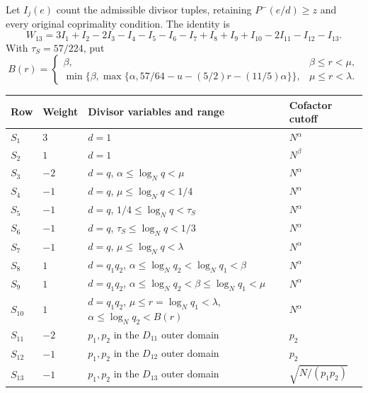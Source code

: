 Let $I_j(e)$ count the admissible divisor tuples,
retaining $P^-(e/d)\ge z$ and every original coprimality condition.
The identity is
\[
 W_{13}=3I_1+I_2-2I_3-I_4-I_5-I_6-I_7
                 +I_8+I_9+I_{10}-2I_{11}-I_{12}-I_{13}.
 \tag{4.7}
\]
With $\tau_S=57/224$, put
\[
 B(r)=
 \begin{cases}
 \beta,&\beta\le r<\mu,\\
 \min\{\beta,\max\{\alpha,57/64-u-(5/2)r-(11/5)\alpha\}\},
             &\mu\le r<\lambda.
 \end{cases}
 \tag{4.8}
\]
\begingroup
\setlength{\tabcolsep}{3pt}
\begin{longtable}{@{}>{\raggedright\arraybackslash}p{}>{\raggedright\arraybackslash}p{}>{\raggedright\arraybackslash}p{}>{\raggedright\arraybackslash}p{}@{}}
\toprule
Row & Weight & Divisor variables and range & Cofactor cutoff \\
\midrule
$S_1$ & $3$ & $d=1$ & $N^\alpha$ \\
$S_2$ & $1$ & $d=1$ & $N^\beta$ \\
$S_3$ & $-2$ & $d=q$, $\alpha\le\log_Nq<\mu$ & $N^\alpha$ \\
$S_4$ & $-1$ & $d=q$, $\mu\le\log_Nq<1/4$ & $N^\alpha$ \\
$S_5$ & $-1$ & $d=q$, $1/4\le\log_Nq<\tau_S$ & $N^\alpha$ \\
$S_6$ & $-1$ & $d=q$, $\tau_S\le\log_Nq<1/3$ & $N^\alpha$ \\
$S_7$ & $-1$ & $d=q$, $\mu\le\log_Nq<\lambda$ & $N^\alpha$ \\
$S_8$ & $1$ & $d=q_1q_2$, $\alpha\le\log_Nq_2<\log_Nq_1<\beta$ & $N^\alpha$ \\
$S_9$ & $1$ & $d=q_1q_2$, $\alpha\le\log_Nq_2<\beta\le\log_Nq_1<\mu$ & $N^\alpha$ \\
$S_{10}$ & $1$ & $d=q_1q_2$, $\mu\le r=\log_Nq_1<\lambda$, $\alpha\le\log_Nq_2<B(r)$ & $N^\alpha$ \\
$S_{11}$ & $-2$ & $p_1,p_2$ in the $D_{11}$ outer domain & $p_2$ \\
$S_{12}$ & $-1$ & $p_1,p_2$ in the $D_{12}$ outer domain & $p_2$ \\
$S_{13}$ & $-1$ & $p_1,p_2$ in the $D_{13}$ outer domain & $\sqrt{N/(p_1p_2)}$ \\
\bottomrule
\end{longtable}
\endgroup

